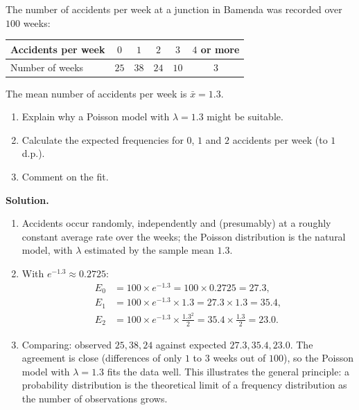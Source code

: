 \documentclass[11pt]{article}
\begin{document}
\begin{exoresolu}
The number of accidents per week at a junction in Bamenda was recorded over $100$ weeks:
\begin{center}
\begin{tabular}{|l|c|c|c|c|c|}
\hline
\rowcolor{popblueL} Accidents per week & $0$ & $1$ & $2$ & $3$ & $4$ or more \\
\hline
Number of weeks & $25$ & $38$ & $24$ & $10$ & $3$ \\
\hline
\end{tabular}
\end{center}
The mean number of accidents per week is $\bar{x} = 1.3$.
\begin{enumerate}
\item Explain why a Poisson model with $\lambda = 1.3$ might be suitable.
\item Calculate the expected frequencies for $0$, $1$ and $2$ accidents per week (to $1$ d.p.).
\item Comment on the fit.
\end{enumerate}
\tcblower
\textbf{Solution.}
\begin{enumerate}
\item Accidents occur randomly, independently and (presumably) at a roughly constant average rate over the weeks; the Poisson distribution is the natural model, with $\lambda$ estimated by the sample mean $1.3$.
\item With $e^{-1.3} \approx 0.2725$:
\begin{align*}
E_0 &= 100 \times e^{-1.3} = 100 \times 0.2725 = 27.3,\\
E_1 &= 100 \times e^{-1.3} \times 1.3 = 27.3 \times 1.3 = 35.4,\\
E_2 &= 100 \times e^{-1.3} \times \frac{1.3^{2}}{2} = 35.4 \times \frac{1.3}{2} = 23.0.
\end{align*}
\item Comparing: observed $25, 38, 24$ against expected $27.3, 35.4, 23.0$. The agreement is close (differences of only $1$ to $3$ weeks out of $100$), so the Poisson model with $\lambda = 1.3$ fits the data well. This illustrates the general principle: a probability distribution is the theoretical limit of a frequency distribution as the number of observations grows.
\end{enumerate}
\end{exoresolu}
\end{document}
